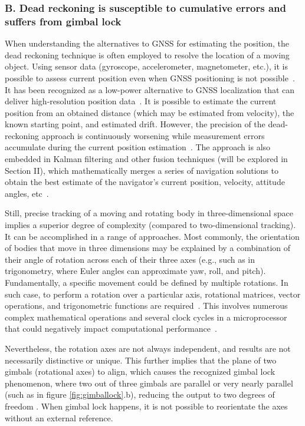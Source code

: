 \subsubsection{B. Dead reckoning is susceptible to cumulative errors and suffers from gimbal lock} %
When understanding the alternatives to GNSS for estimating the position, the dead reckoning technique is often employed to resolve the location of a moving object. Using sensor data (gyroscope, accelerometer, magnetometer, etc.), it is possible to assess current position even when GNSS positioning is not possible~\cite{omar2016integration}. It has been recognized as a low-power alternative to GNSS localization that can deliver high‐resolution position data~\cite{dewhirst2016improving}. It is possible to estimate the current position from an obtained distance (which may be estimated from velocity), the known starting point, and estimated drift. However, the precision of the dead-reckoning approach is continuously worsening while measurement errors accumulate during the current position estimation~\cite{kao1991integration}. The approach is also embedded in Kalman filtering and other fusion techniques (will be explored in Section II), which mathematically merges a series of navigation solutions to obtain the best estimate of the navigator's current position, velocity, attitude angles, etc~\cite{krakiwsky1988kalman}.

Still, precise tracking of a moving and rotating body in three-dimensional space implies a superior degree of complexity (compared to two-dimensional tracking). It can be accomplished in a range of approaches. Most commonly, the orientation of bodies that move in three dimensions may be explained by a combination of their angle of rotation across each of their three axes (e.g., such as in trigonometry, where Euler angles can approximate yaw, roll, and pitch). Fundamentally, a specific movement could be defined by multiple rotations. In such case, to perform a rotation over a particular axis, rotational matrices, vector operations, and trigonometric functions are required~\cite{bojanczyk1991computation}. This involves numerous complex mathematical operations and several clock cycles in a microprocessor that could negatively impact computational performance~\cite{janota2015improving}.

Nevertheless, the rotation axes are not always independent, and results are not necessarily distinctive or unique. This further implies that the plane of two gimbals (rotational axes) to align, which causes the recognized gimbal lock phenomenon, where two out of three gimbals are parallel or very nearly parallel (such as in figure \ref{fig:gimballock}.b), reducing the output to two degrees of freedom \cite{hemingway2018perspectives}. When gimbal lock happens, it is not possible to reorientate the axes without an external reference.

